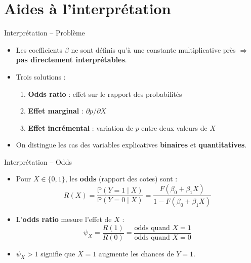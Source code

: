 \documentclass[11pt,aspectratio=169]{beamer}
\newcommand{\PP}{\mathbb{P}}
\begin{document}
\section{Aides à l'interprétation}

\begin{frame}{Interprétation -- Problème}

\begin{itemize}

\item Les coefficients $\beta$ ne sont définis qu'à une constante
  multiplicative près $\Rightarrow$ \textbf{pas directement
  interprétables}.\newline

\item Trois solutions :
  \begin{enumerate}
  \item \textbf{Odds ratio} : effet sur le rapport des probabilités\newline
  \item \textbf{Effet marginal} : $\partial p / \partial X$\newline
  \item \textbf{Effet incrémental} : variation de $p$ entre deux valeurs
    de $X$
  \end{enumerate}

\item On distingue les cas des variables explicatives \textbf{binaires} et
  \textbf{quantitatives}.

\end{itemize}

\end{frame}

\begin{frame}{Interprétation -- Odds}

\begin{itemize}

\item Pour $X \in \{0, 1\}$, les \textbf{odds} (rapport des cotes) sont :
  \[
  R(X) = \frac{\PP(Y=1 \mid X)}{\PP(Y=0 \mid X)} = \frac{F(\beta_0 + \beta_1 X)}{1 - F(\beta_0 + \beta_1 X)}
  \]

\item L'\textbf{odds ratio} mesure l'effet de $X$ :
  \[
  \psi_X = \frac{R(1)}{R(0)} = \frac{\text{odds quand } X=1}{\text{odds quand } X=0}
  \]

\item $\psi_X > 1$ signifie que $X=1$ augmente les chances de $Y=1$.

\end{itemize}

\end{frame}
\end{document}
